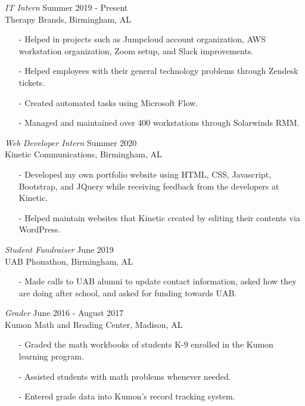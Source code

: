 \documentclass[margin, 10pt]{res} %
\begin{document}
\begin{resume}
{\sl IT Intern} \hfill Summer 2019 - Present \\
Therapy Brands, Birmingham, AL 
\begin{itemize} \itemsep -2pt %
\item[-] Helped in projects such as Jumpcloud account organization, AWS workstation organization, Zoom setup, and Slack improvements.
\item[-] Helped employees with their general technology problems through Zendesk tickets.
\item[-] Created automated tasks using Microsoft Flow.
\item[-] Managed and maintained over 400 workstations through Solarwinds RMM.
\end{itemize} 

{\sl Web Developer Intern} \hfill Summer 2020 \\
Kinetic Communications, Birmingham, AL
\begin{itemize} \itemsep -2pt %
\item[-] Developed my own portfolio website using HTML, CSS, Javascript, Bootstrap, and JQuery while receiving feedback from the developers at Kinetic. 
\item[-] Helped maintain websites that Kinetic created by editing their contents via WordPress. 
\end{itemize}

{\sl Student Fundraiser} \hfill June 2019 \\
UAB Phonathon, Birmingham, AL
\begin{itemize} \itemsep -2pt %
\item[-] Made calls to UAB alumni to update contact information, asked how they are doing after school, and asked for funding towards UAB.
\end{itemize}

{\sl Grader} \hfill June 2016 - August 2017 \\
Kumon Math and Reading Center, Madison, AL
\begin{itemize} \itemsep -2pt %
\item[-] Graded the math workbooks of students K-9 enrolled in the Kumon learning program.
\item[-] Assisted students with math problems whenever needed.
\item[-] Entered grade data into Kumon's record tracking system.
\end{itemize}


\end{resume}
\end{document}
